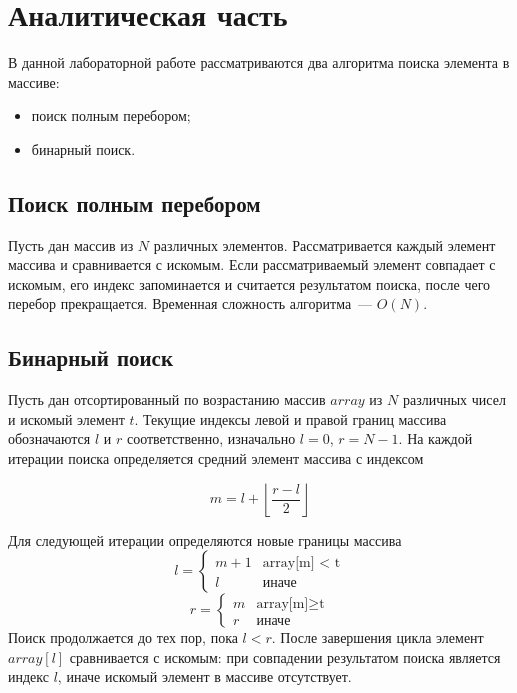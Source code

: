 \chapter{Аналитическая часть}
В данной лабораторной работе рассматриваются два алгоритма поиска элемента в массиве:
\begin{itemize}
	\item поиск полным перебором;
	\item бинарный поиск.
\end{itemize}

\section{Поиск полным перебором}
Пусть дан массив из $N$ различных элементов. Рассматривается каждый элемент массива и сравнивается с искомым. Если рассматриваемый элемент совпадает с искомым, его индекс запоминается и считается результатом поиска, после чего перебор прекращается. Временная сложность алгоритма~--- $O(N)$.

\section{Бинарный поиск}
Пусть дан отсортированный по возрастанию массив $array$ из $N$ различных чисел и искомый элемент $t$. Текущие индексы левой и правой границ массива обозначаются $l$ и $r$ соответственно, изначально $l = 0$, $r = N - 1$. На каждой итерации поиска определяется средний элемент массива с индексом

\begin{equation}
	\label{eq:bin_s_m}
	m = l + \left\lfloor \frac{r - l}{2} \right\rfloor
\end{equation}

Для следующей итерации определяются новые границы массива
\begin{equation}
	\label{eq:new_l}
	l = 
	\begin{cases}
		m+1 & \text{array[m] < t} \\
		l & \text{иначе}
	\end{cases}
\end{equation}
\begin{equation}
	\label{eq:new_r}
	r = 
	\begin{cases}
		m & \text{array[m]} \geq \text{t} \\
		r & \text{иначе}
	\end{cases}
\end{equation}
Поиск продолжается до тех пор, пока $l < r$. После завершения цикла элемент $array[l]$ сравнивается с искомым: при совпадении результатом поиска является индекс $l$, иначе искомый элемент в массиве отсутствует.


